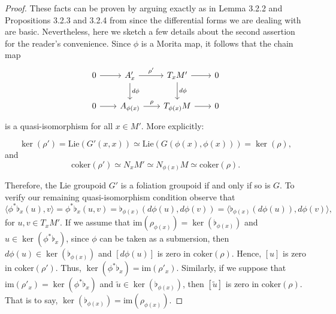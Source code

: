 \documentclass[
  a4paper, 
  reqno, 
  oneside, 
  12pt
]{amsart}
\theoremstyle{definition}
\theoremstyle{remark}
\begin{document}
\begin{proof}
These facts can be proven by arguing exactly as in Lemma 3.2.2 and  Propositions 3.2.3 and 3.2.4 from \cite{Maglio} since the differential forms we are dealing with are basic. Nevertheless, here we sketch a few details about the second assertion for the reader's convenience. Since $\phi$ is a Morita map, it follows that the chain map
\begin{equation*}
\begin{tikzcd}[row sep=2em, column sep=2em]
0\arrow[r]&A'_x\arrow[r,"\rho'"]\arrow[d,"d\phi"]&T_xM'\arrow[d,"d\phi"]\arrow[r]&0\\
0\arrow[r]&A_{\phi(x)}\arrow[r,"\rho"]& T_{\phi(x)}M\arrow[r]&0
\end{tikzcd}
\end{equation*}	
is a quasi-isomorphism for all $x\in M'$. More explicitly:

$$\ker(\rho')=\text{Lie}(G'(x,x))\simeq \text{Lie}(G(\phi(x),\phi(x)))=\ker(\rho),$$
and $$\text{coker}(\rho')\simeq N_xM'\simeq N_{\phi(x)}M\simeq \text{coker}(\rho).$$

Therefore, the Lie groupoid $G'$ is a foliation groupoid if and only if so is $G$. To verify our remaining quasi-isomorphism condition observe that $$\langle \phi^*\flat_{x}(u),v\rangle=\phi ^*\flat_{x}(u,v)=\flat_{\phi(x)}(d\phi(u),d\phi(v))=\langle \flat_{\phi(x)}(d\phi(u)),d\phi(v)\rangle,$$
for $u,v\in T_x M'$.
If we assume that $\text{im}(\rho_{\phi(x)})=\ker(\flat_{\phi(x)})$ and $u\in \ker(\phi^*\flat_x)$, since $\phi$ can be taken as a submersion, then $d\phi(u)\in \ker (\flat_{\phi(x)})$ and  $[d\phi(u)]$ is zero in $\text{coker}(\rho)$. Hence,  $[u]$ is zero in $\text{coker}(\rho')$. Thus,  $\ker(\phi^*\flat_x)=\text{im}(\rho'_x)$. Similarly, if we suppose that $\text{im}(\rho'_x)= \ker (\phi^*\flat_x)$ and $\tilde u\in \ker (\flat_{\phi(x)})$, then  $[\tilde u]$ is zero in $\text{coker}(\rho)$. That is to say, $\ker(\flat_{\phi(x)})=\text{im}(\rho_{\phi(x)}).$


\end{proof}
\end{document}
